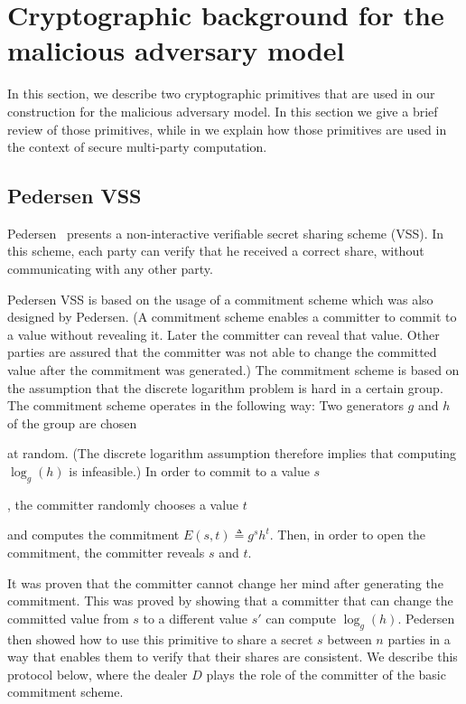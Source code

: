 \documentclass[10pt]{svjour3}
\begin{document}
\section{Cryptographic background for the malicious adversary model}
In this section, we describe two cryptographic primitives that are used
in our construction for the malicious adversary model. In this section we
give a brief review of those primitives, while in  we
explain how those primitives are used in the context of secure multi-party computation.

\label{crypto2}
\subsection{Pedersen VSS}\label{Pedersen2}

Pedersen~\cite{Pedersen91} presents a non-interactive verifiable
secret sharing scheme (VSS). In this scheme, each party can verify that he received a
correct share, without communicating with any other party.

Pedersen VSS is based on the usage of a commitment scheme which was
also designed by Pedersen. (A commitment scheme enables a committer to
commit to a value without revealing it. Later the committer can reveal
that value. Other parties are assured that the committer was not able
to change the committed value after the commitment was generated.)
The commitment scheme
is based on the assumption that the discrete logarithm problem is hard
in a certain group. The commitment scheme operates in the following
way: Two generators $g$ and $h$ of the group are chosen  at random. (The discrete logarithm assumption therefore
implies that computing $\log_g(h)$ is infeasible.)  In order to
commit to a value $s$ , the committer randomly
chooses a value $t$  and computes the
commitment $E(s,t) \triangleq g^sh^t$.
Then, in order to open the commitment, the committer reveals $s$
and $t$.

It was proven that the committer cannot change her mind after
generating the commitment. This was proved by showing that a committer
that can change the committed value from $s$ to a different value $s'$
can compute $\log_g(h)$. Pedersen then showed how to use this primitive
to share a secret $s$ between $n$ parties in a way that enables them
to verify that their shares are consistent. We describe this protocol
below,
where the
dealer $D$ plays the role of the committer of the basic commitment
scheme.
\end{document}
